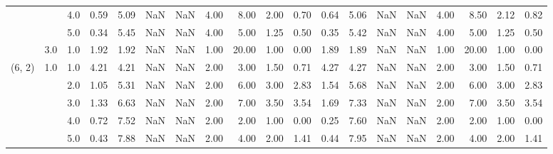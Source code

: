 \begin{tabular}{lllrrrrrrrrrrrrrrrr}
       &     & 4.0  &      0.59 &       5.09 &               NaN &                NaN & 4.00 &   8.00 &             2.00 &                         0.70 &      0.64 &       5.06 &               NaN &                NaN & 4.00 &   8.50 &             2.12 &                         0.82 \\
       &     & 5.0  &      0.34 &       5.45 &               NaN &                NaN & 4.00 &   5.00 &             1.25 &                         0.50 &      0.35 &       5.42 &               NaN &                NaN & 4.00 &   5.00 &             1.25 &                         0.50 \\
       & 3.0 & 1.0  &      1.92 &       1.92 &               NaN &                NaN & 1.00 &  20.00 &             1.00 &                         0.00 &      1.89 &       1.89 &               NaN &                NaN & 1.00 &  20.00 &             1.00 &                         0.00 \\
(6, 2) & 1.0 & 1.0  &      4.21 &       4.21 &               NaN &                NaN & 2.00 &   3.00 &             1.50 &                         0.71 &      4.27 &       4.27 &               NaN &                NaN & 2.00 &   3.00 &             1.50 &                         0.71 \\
       &     & 2.0  &      1.05 &       5.31 &               NaN &                NaN & 2.00 &   6.00 &             3.00 &                         2.83 &      1.54 &       5.68 &               NaN &                NaN & 2.00 &   6.00 &             3.00 &                         2.83 \\
       &     & 3.0  &      1.33 &       6.63 &               NaN &                NaN & 2.00 &   7.00 &             3.50 &                         3.54 &      1.69 &       7.33 &               NaN &                NaN & 2.00 &   7.00 &             3.50 &                         3.54 \\
       &     & 4.0  &      0.72 &       7.52 &               NaN &                NaN & 2.00 &   2.00 &             1.00 &                         0.00 &      0.25 &       7.60 &               NaN &                NaN & 2.00 &   2.00 &             1.00 &                         0.00 \\
       &     & 5.0  &      0.43 &       7.88 &               NaN &                NaN & 2.00 &   4.00 &             2.00 &                         1.41 &      0.44 &       7.95 &               NaN &                NaN & 2.00 &   4.00 &             2.00 &                         1.41 \\

\end{tabular}
